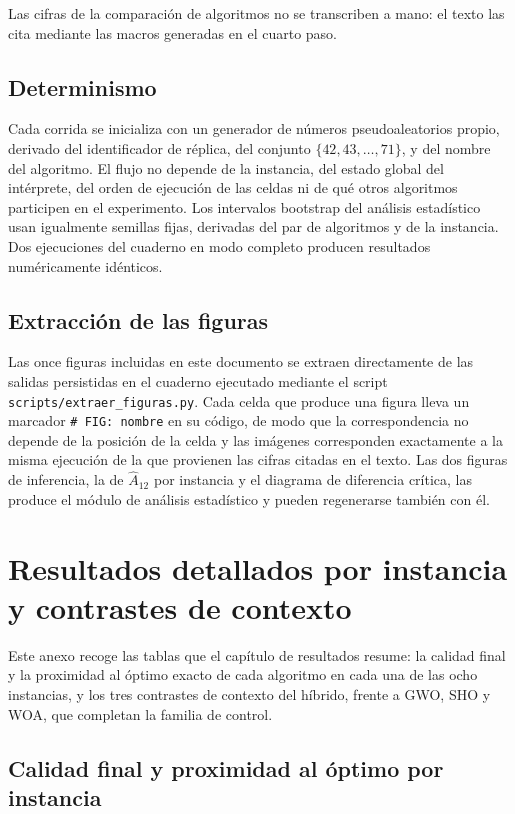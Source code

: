 Las cifras de la comparación de algoritmos no se transcriben a mano: el texto las cita mediante las macros generadas en el cuarto paso.

\section{Determinismo}

Cada corrida se inicializa con un generador de números pseudoaleatorios propio, derivado del identificador de réplica, del conjunto $\{42, 43, \ldots, 71\}$, y del nombre del algoritmo. El flujo no depende de la instancia, del estado global del intérprete, del orden de ejecución de las celdas ni de qué otros algoritmos participen en el experimento. Los intervalos bootstrap del análisis estadístico usan igualmente semillas fijas, derivadas del par de algoritmos y de la instancia. Dos ejecuciones del cuaderno en modo completo producen resultados numéricamente idénticos.

\section{Extracción de las figuras}

Las once figuras incluidas en este documento se extraen directamente de las salidas persistidas en el cuaderno ejecutado mediante el script \texttt{scripts/extraer\_figuras.py}. Cada celda que produce una figura lleva un marcador \texttt{\# FIG: nombre} en su código, de modo que la correspondencia no depende de la posición de la celda y las imágenes corresponden exactamente a la misma ejecución de la que provienen las cifras citadas en el texto. Las dos figuras de inferencia, la de $\hat{A}_{12}$ por instancia y el diagrama de diferencia crítica, las produce el módulo de análisis estadístico y pueden regenerarse también con él.

\chapter{Resultados detallados por instancia y contrastes de contexto}
\label{anx:detalle}

Este anexo recoge las tablas que el capítulo de resultados resume: la calidad final y la proximidad al óptimo exacto de cada algoritmo en cada una de las ocho instancias, y los tres contrastes de contexto del híbrido, frente a GWO, SHO y WOA, que completan la familia de control.

\section{Calidad final y proximidad al óptimo por instancia}

